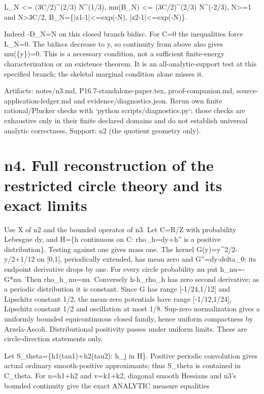 \documentclass[11pt]{article}
\begin{document}
L\_N <= (3C/2)\textasciicircum{}(2/3) N\textasciicircum{}(1/3),
mu(B\_N) <= (3C/2)\textasciicircum{}(2/3) N\textasciicircum{}(-2/3), N>=1 and N>3C/2,
B\_N=\{|z1-1|<=exp(-N), |z2-1|<=exp(-N)\}.

Indeed -D\_N=N on this closed branch bidisc. For C=0 the inequalities force L\_N=0. The bidiscs decrease to y, so continuity from above also gives mu(\{y\})=0. This is a necessary condition, not a sufficient finite-energy characterization or an existence theorem. It is an all-analytic-support test at this specified branch; the skeletal marginal condition alone misses it.

Artifacts: notes/n3.md, P16.7-standalone-paper.tex, proof-companion.md, source-application-ledger.md and evidence/diagnostics.json. Rerun own finite rational/Plucker checks with `python scripts/diagnostics.py`; those checks are exhaustive only in their finite declared domains and do not establish universal analytic correctness. Support: n2 (the quotient geometry only).


\section{n4. Full reconstruction of the restricted circle theory and its exact limits}

Use X of n2 and the bounded operator of n3. Let C=R/Z with probability Lebesgue dy, and H=\{h continuous on C: rho\_h=dy+h'' is a positive distribution\}. Testing against one gives mass one. The kernel G(y)=y\textasciicircum{}2/2-y/2+1/12 on [0,1], periodically extended, has mean zero and G''=dy-delta\_0: its endpoint derivative drops by one. For every circle probability nu put h\_nu=-G*nu. Then rho\_h\_nu=nu. Conversely h-h\_rho\_h has zero second derivative; as a periodic distribution it is constant. Since G has range [-1/24,1/12] and Lipschitz constant 1/2, the mean-zero potentials have range [-1/12,1/24], Lipschitz constant 1/2 and oscillation at most 1/8. Sup-zero normalization gives a uniformly bounded equicontinuous closed family, hence uniform compactness by Arzela-Ascoli. Distributional positivity passes under uniform limits. These are circle-direction statements only.

Let S\_theta=\{h1(tau1)+h2(tau2): h\_j in H\}. Positive periodic convolution gives actual ordinary smooth-positive approximants; thus S\_theta is contained in C\_theta. For u=h1+h2 and v=k1+k2, diagonal smooth Hessians and n3's bounded continuity give the exact ANALYTIC measure equalities
\end{document}
